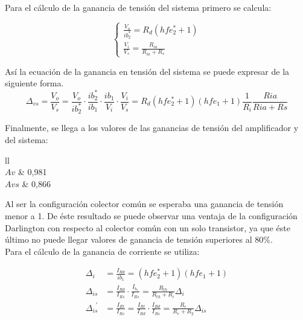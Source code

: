 Para el cálculo de la ganancia de tensión del sistema primero se calcula:

	\begin{equation}
		\begin{cases}	
		\frac{V_{o}}{ib_{2}^{*}}=R_{d}(hfe_{2}^{*}+1) \\
		\frac{V_{i}}{V_{s}}=\frac{R_{ia}}{R_{ia}+R_{s}}
		\end{cases}
		\label{mod_inc_ecs}
	\end{equation}

Así la ecuación de la ganancia en tensión del sistema se puede expresar de la siguiente forma. \\

	\begin{equation}	
		\Delta _{vs}=\frac{V_{o}}{V_{s}}=\frac{V_{o}}{ib_{2}^{*}}\cdot\frac{ib_{2}^{*}}{ib_{1}}\cdot\frac{ib_{1}}{V_{i}}\cdot\frac{V_{i}}{V_{s}}=R_{d}(hfe_{2}^{*}+1)(hfe_{1}+1)\frac{1}{R_{i}}\frac{Ria}{Ria+Rs}
		\label{mod_inc_avs}
	\end{equation}

Finalmente, se llega a los valores de las ganancias de tensión del amplificador y del sistema:

\begin{table}[H]
\centering
\begin{tabular}{ll}
 \\ \hline
$Av$                                       & 0,981                                     \\
$Avs$                                      & 0,866                                    
\end{tabular}
\end{table}

Al ser la configuración colector común se esperaba una ganancia de tensión menor a 1. De éste resultado se puede observar una ventaja de la configuración Darlington con respecto al colector común con un solo transistor, ya que éste último no puede llegar valores de ganancia de tensión superiores al 80\%.\\
Para el cálculo de la ganancia de corriente se utiliza:

	\begin{align*}
		\Delta _{i} &= \frac{I_{Rd}}{ib_{1}}=(hfe_{2}^{*}+1)(hfe_{1}+1) \\
%
	\Delta_{is} &= \frac{I_{Rd}}{I_{Rs}}\cdot\frac{I_{b_{1}}}{I_{Rs}}=\frac{R_{th}}{R_{th}+R_{i}}\Delta_{i} \\
%
		\Delta_{is}^{\, \, \,'} &= \frac{I_{Rl}}{I_{Rs}}=\frac{I_{Rl}}{I_{Rd}}\cdot\frac{I_{Rd}}{I_{Rs}}=\frac{R_{e}}{R_{e}	+R_{2}}\Delta_{is}
%
		\label{mod_inc_ais}
	\end{align*}


